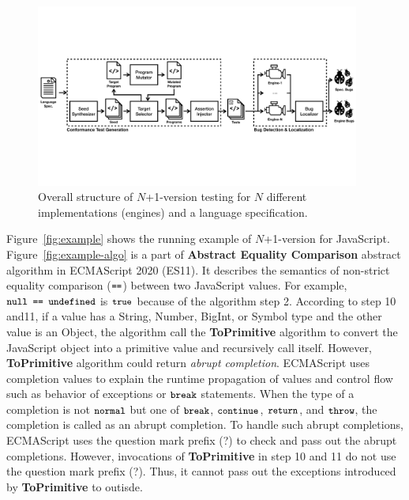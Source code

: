 \begin{figure}[t]
  \centering
  \includegraphics[width=0.95\textwidth]{img/n+1-version-testing.pdf}
  \caption{Overall structure of $N$+1-version testing for $N$ different
    implementations (engines) and a language specification.}
  \label{fig:overall}
  \vspace*{-1em}
\end{figure}

Figure~\ref{fig:example} shows the running example of $N$+1-version for
JavaScript.  Figure~\ref{fig:example-algo} is a part of \textbf{Abstract Equality
Comparison} abstract algorithm in ECMAScript 2020 (ES11).  It describes the
semantics of non-strict equality comparison ($\code{==}$) between two JavaScript
values.  For example, $\code{null == undefined}$ is $\code{true}$ because of the
algorithm step 2.  According to step 10 and11, if a value has a String, Number,
BigInt, or Symbol type and the other value is an Object, the algorithm call the
\textbf{ToPrimitive} algorithm to convert the JavaScript object into a primitive
value and recursively call itself.  However, \textbf{ToPrimitive} algorithm
could return \textit{abrupt completion}.  ECMAScript uses completion values to
explain the runtime propagation of values and control flow such as behavior of
exceptions or $\code{break}$ statements.  When the type of a completion is not
$\code{normal}$ but one of $\code{break}$, $\code{continue}$, $\code{return}$,
and $\code{throw}$, the completion is called as an abrupt completion.  To handle
such abrupt completions, ECMAScript uses the question mark prefix (?) to check
and pass out the abrupt completions.  However, invocations of
\textbf{ToPrimitive} in step 10 and 11 do not use the question mark prefix (?).
Thus, it cannot pass out the exceptions introduced by \textbf{ToPrimitive} to
outisde.

